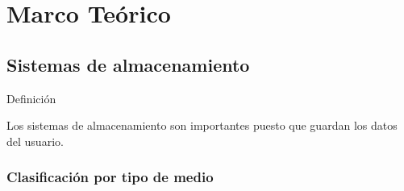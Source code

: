   \chapter{Marco Te\'{o}rico}
  \label{chap:cap1}
    \section {Sistemas de almacenamiento}
    
Definici\'{o}n

Los sistemas de almacenamiento son importantes puesto que guardan los datos del usuario.

%

\subsection {Clasificaci\'{o}n por tipo de medio} \cite{_ibm_????}

